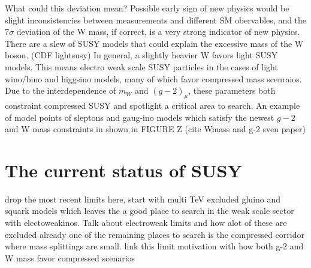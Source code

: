 What could this deviation mean?
Possible early sign of new physics would be slight inconsistencies between measurements and different SM obervables, and the $7\sigma$ deviation of the W mass, if correct, is a very strong indicator of new physics. There are a slew of SUSY models that could explain the excessive mass of the W boson. (CDF lightsusy) In general, a slightly heavier W favors light SUSY models. This means electro weak scale SUSY particles in the cases of light wino/bino and higgsino models, many of which favor compressed mass scenraios. Due to the interdependence of $m_W$ and $(g-2)_\mu$, these parameters both constraint compressed SUSY and spotlight a critical area to search. An example of model points of sleptons and gaug-ino models which satisfy the newest $g-2$ and W mass constraints in shown in FIGURE Z (cite Wmass and g-2 sven paper)


\section{The current status of SUSY}
drop the most recent limits here, start with multi TeV excluded gluino and squark models which leaves the a good place to search in the weak scale sector with electoweakinos. Talk about electroweak limits and how alot of these are excluded already one of the remaining places to search is the compressed corridor where mass splittings are small. link this limit motivation with how both g-2 and W mass favor compressed scenarios



